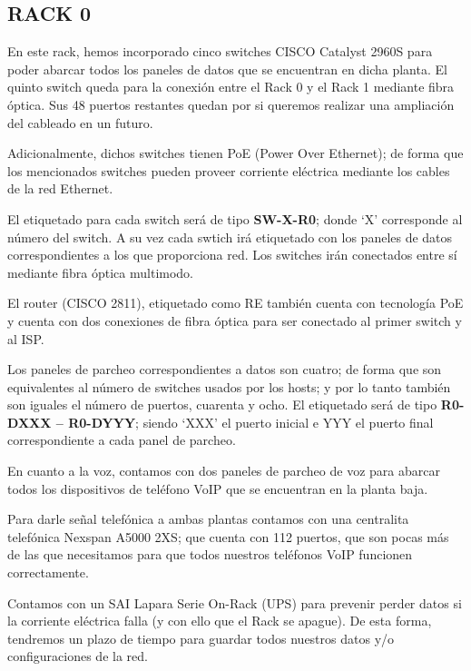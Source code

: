 \subsection{RACK 0}
En este rack, hemos incorporado cinco switches CISCO Catalyst 2960S para poder abarcar todos los paneles de datos que se encuentran en dicha planta. El quinto switch queda para la conexión entre el Rack 0 y el Rack 1 mediante fibra óptica. Sus 48 puertos restantes quedan por si queremos realizar una ampliación del cableado en un futuro.

Adicionalmente, dichos switches tienen PoE (Power Over Ethernet); de forma que los mencionados switches pueden proveer corriente eléctrica mediante los cables de la red Ethernet.

El etiquetado para cada switch será de tipo \textbf{SW-X-R0}; donde ‘X’ corresponde al número del switch. A su vez cada swtich irá etiquetado con los paneles de datos correspondientes a los que proporciona red. Los switches irán conectados entre sí mediante fibra óptica multimodo.

El router (CISCO 2811), etiquetado como RE también cuenta con tecnología PoE y cuenta con dos conexiones de fibra óptica para ser conectado al primer switch y al ISP.

Los paneles de parcheo correspondientes a datos son cuatro; de forma que son equivalentes al número de switches usados por los hosts; y por lo tanto también son iguales el número de puertos, cuarenta y ocho. El etiquetado será de tipo \textbf{R0-DXXX – R0-DYYY}; siendo ‘XXX’ el puerto inicial e YYY el puerto final correspondiente a cada panel de parcheo.

En cuanto a la voz, contamos con dos paneles de parcheo de voz para abarcar todos los dispositivos de teléfono VoIP que se encuentran en la planta baja.

Para darle señal telefónica a ambas plantas contamos con una centralita telefónica Nexspan A5000 2XS; que cuenta con 112 puertos, que son pocas más de las que necesitamos para que todos nuestros teléfonos VoIP funcionen correctamente.

Contamos con un SAI Lapara Serie On-Rack (UPS) para prevenir perder datos si la corriente eléctrica falla (y con ello que el Rack se apague). De esta forma, tendremos un plazo de tiempo para guardar todos nuestros datos y/o  configuraciones de la red.

